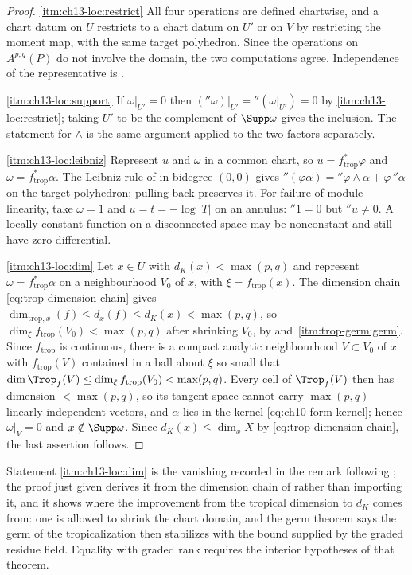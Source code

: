 \begin{proof}
\cref{itm:ch13-loc:restrict} All four operations are defined chartwise, and a
chart datum on $U$ restricts to a chart datum on $U'$ or on $V$ by
restricting the moment map, with the same target polyhedron.  Since the
operations on $A^{p,q}(P)$ do not involve the domain, the two computations
agree.  Independence of the representative is
.

\cref{itm:ch13-loc:support} If $\omega|_{U'}=0$ then
$(\dprime\omega)|_{U'}=\dprime(\omega|_{U'})=0$ by
\cref{itm:ch13-loc:restrict}; taking $U'$ to be the complement of
$\Supp\omega$ gives the inclusion.  The statement for $\wedge$ is the same
argument applied to the two factors separately.

\cref{itm:ch13-loc:leibniz} Represent $u$ and $\omega$ in a common chart, so
$u=f_{\mathrm{trop}}^*\varphi$ and $\omega=f_{\mathrm{trop}}^*\alpha$.  The
Leibniz rule of  in bidegree
$(0,0)$ gives $\dprime(\varphi\alpha)=\dprime\varphi\wedge\alpha
+\varphi\,\dprime\alpha$ on the target polyhedron; pulling back preserves it.
For failure of module linearity, take $\omega=1$ and $u=t=-\log|T|$
on an annulus: $\dprime1=0$ but $\dprime u\ne0$.  A locally constant
function on a disconnected space may be nonconstant and still have zero
differential.

\cref{itm:ch13-loc:dim} Let $x\in U$ with $d_K(x)<\max(p,q)$ and represent
$\omega=f_{\mathrm{trop}}^*\alpha$ on a neighbourhood $V_0$ of $x$, with
$\xi=f_{\mathrm{trop}}(x)$.  The dimension chain
\eqref{eq:trop-dimension-chain} gives
$\dim_{\mathrm{trop},x}(f)\le d_x(f)\le d_K(x)<\max(p,q)$, so
$\dim_\xi f_{\mathrm{trop}}(V_0)<\max(p,q)$ after shrinking $V_0$, by
 and
\,\cref{itm:trop-germ:germ}.  Since
$f_{\mathrm{trop}}$ is continuous, there is a compact analytic neighbourhood
$V\subset V_0$ of $x$ with $f_{\mathrm{trop}}(V)$ contained in a ball about
$\xi$ so small that
$\dim\Trop_f(V)\le\dim_\xi f_{\mathrm{trop}}(V_0)<\max(p,q)$.  Every cell of
$\Trop_f(V)$ then has dimension $<\max(p,q)$, so its tangent space cannot
carry $\max(p,q)$ linearly independent vectors, and $\alpha$ lies in the
kernel \eqref{eq:ch10-form-kernel}; hence $\omega|_{V}=0$ and
$x\notin\Supp\omega$.  Since $d_K(x)\le\dim_xX$ by
\eqref{eq:trop-dimension-chain}, the last assertion follows.
\end{proof}

Statement \cref{itm:ch13-loc:dim} is the vanishing recorded in the remark
following ; the proof just given derives it from
the dimension chain of  rather than
importing it, and it shows where the improvement from the tropical dimension
to $d_K$ comes from: one is allowed to shrink the chart domain, and the germ
theorem  says the germ of the tropicalization then
stabilizes with the bound supplied by the graded residue field.  Equality
with graded rank requires the interior hypotheses of that theorem.

